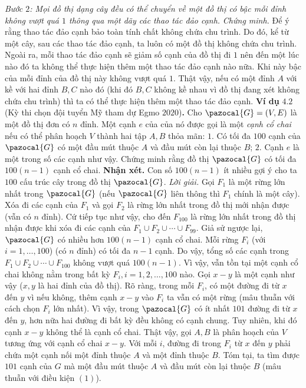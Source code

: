 \begin{multicols}{2}
\begin{figure}[H]
	\end{figure} 
	\textit{Bước $2$: Mọi đồ thị dạng cây đều có thể chuyển về một đồ thị có bậc mỗi đỉnh không vượt quá $1$ thông qua một dãy các thao tác đảo cạnh.}
	\vskip 0.1cm
	\textit{Chứng minh.} Để ý rằng thao tác đảo cạnh  bảo toàn tính chất không chứa chu trình. Do đó, kể từ một cây, sau các thao tác đảo cạnh, ta luôn có một đồ thị không chứa chu trình. Ngoài ra, mỗi thao tác đảo cạnh sẽ giảm số cạnh của đồ thị đi $1$ nên  đến một lúc nào đó ta không thể thực hiện thêm một thao tác đảo cạnh nào nữa. Khi này bậc của mỗi đỉnh của đồ thị này không vượt quá $1$. Thật vậy, nếu có một đỉnh $A$ với  kề với hai đỉnh $B,C$ nào đó (khi đó $B,C$ không kề nhau vì đồ thị đang xét không chứa chu trình) thì ta có thể thực hiện thêm một thao tác đảo cạnh.
	\vskip 0.1cm
	\textbf{\color{hoccungpi}Ví dụ} $\pmb{4.2}$ (Kỳ thi chọn đội tuyển Mỹ tham dự Egmo $2020$)\textbf{\color{hoccungpi}.} Cho $\pazocal{G}=(V,E)$ là một  đồ thị đơn có $n$ đỉnh. Một cạnh $e$ của của nó được gọi là một \textit{cạnh cổ chai} nếu có thể phân hoạch $V$ thành hai  tập $A,B$ thỏa mãn:
	\vskip 0.1cm
	$1.$ Có tối đa $100$ cạnh của $\pazocal{G}$ có một đầu mút thuộc $A$ và đầu mút còn lại thuộc $B$;
	\vskip 0.1cm
	$2.$ Cạnh $e$ là một trong số các cạnh như vậy.
	\vskip 0.1cm 
	Chứng minh rằng đồ thị $\pazocal{G}$ có tối đa $100(n-1)$ cạnh cổ chai.
	\vskip 0.1cm
	\textbf{\color{hoccungpi}Nhận xét. } Con số $100(n-1)$ ít nhiều gợi ý cho ta $100$ cấu trúc cây trong đồ thị $\pazocal{G}$. 
	\vskip 0.1cm
	\textit{Lời giải.} Gọi $F_1$ là một rừng lớn nhất trong $\pazocal{G}$ (nếu $\pazocal{G}$ liên thông thì $F_1$ chính là một cây). Xóa đi các cạnh của $F_1$ và gọi $F_2$ là rừng lớn nhất trong đồ thị mới nhận được (vẫn có $n$ đỉnh). Cứ tiếp tục như vậy, cho đến $F_{100}$ là rừng lớn nhất trong đồ thị nhận được khi xóa đi các cạnh của  $F_1\cup F_2\cup \cdots \cup F_{99}$. Giả sử ngược lại, $\pazocal{G}$ có nhiều hơn $100(n-1)$ cạnh cổ chai. Mỗi rừng $F_i$ (với $i=1,\dots,100$) (có $n$ đỉnh) có tối đa $n-1$ cạnh. Do vậy, tổng số các cạnh trong $F_1\cup F_2\cup \cdots \cup F_{100}$ không vượt quá $100(n-1)$. Vì vậy, vẫn tồn tại một cạnh cổ chai không nằm trong bất kỳ $F_{i}, i=1, 2, \ldots, 100$ nào.
	Gọi $x-y$ là một cạnh như vậy ($x,y$ là hai đỉnh của đồ thị). Rõ ràng, trong mỗi $F_i$, có một đường đi từ $x$ đến $y$ vì nếu không, thêm cạnh $x-y$ vào $F_i$ ta vẫn có một rừng (mâu thuẫn với cách chọn $F_i$ lớn nhất). Vì vậy, trong $\pazocal{G}$ có ít nhất $101$ đường đi từ $x$ đến $y$, hơn nữa hai đường đi bất kỳ đều không có cạnh chung. Tuy nhiên, khi đó cạnh $x-y$ không thể là cạnh cổ chai. Thật vậy, gọi $A,B$ là phân hoạch của $V$ tương ứng với cạnh cổ chai $x-y$. Với mỗi $i$, đường đi  trong $F_i$ từ $x$ đến $y$ phải chứa một cạnh nối một đỉnh thuộc $A$ và một đỉnh thuộc $B$. Tóm tại, ta tìm được $101$ cạnh của $G$ mà một đầu mút thuộc $A$ và  đầu mút còn lại thuộc $B$ (mâu thuẫn với điều kiện $(1)$). 

\end{multicols}
